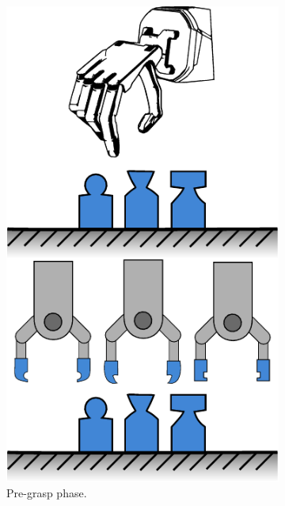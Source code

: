 \begin{figure}[h]
	\centering
	\begin{subfigure}[b]{0.24\textwidth}
		\centering
		\includegraphics[width=\textwidth]{chapters/introduction/fig/pipeline-1.pdf}
		\caption{Pre-grasp phase.\newline}
		\label{fig:pre-grasp-phase}
	\end{subfigure}
	\hfill
	\begin{subfigure}[b]{0.24\textwidth}
		\centering

\end{subfigure}
\end{figure}

